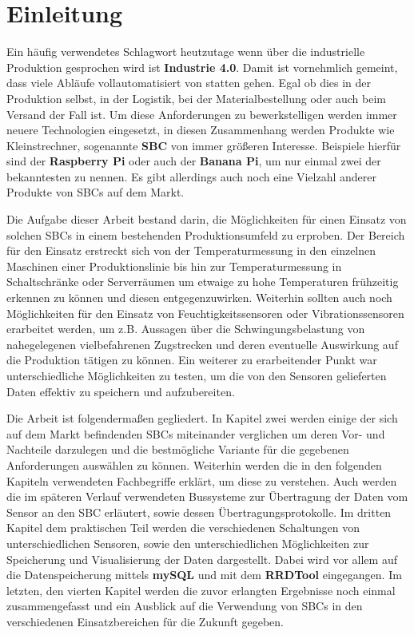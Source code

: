 \chapter{Einleitung}

Ein häufig verwendetes Schlagwort heutzutage wenn über die industrielle Produktion gesprochen wird ist \textbf{Industrie 4.0}. Damit ist vornehmlich gemeint, dass viele Abläufe vollautomatisiert von statten gehen. Egal ob dies in der Produktion selbst, in der Logistik, bei der Materialbestellung oder auch beim Versand der Fall ist. Um diese Anforderungen zu bewerkstelligen werden immer neuere Technologien eingesetzt, in diesen Zusammenhang werden Produkte wie Kleinstrechner, sogenannte \textbf{\ac{SBC}} von immer größeren Interesse. Beispiele hierfür sind der \textbf{\glqq Raspberry Pi\grqq} oder auch der \textbf{\glqq Banana Pi\grqq}, um nur einmal zwei der bekanntesten zu nennen. Es gibt allerdings auch noch eine Vielzahl anderer Produkte von \acp{SBC} auf dem Markt.

Die Aufgabe dieser Arbeit bestand darin, die Möglichkeiten für einen Einsatz von solchen \acp{SBC} in einem bestehenden Produktionsumfeld zu erproben. Der Bereich für den Einsatz erstreckt sich von der Temperaturmessung in den einzelnen Maschinen einer Produktionslinie bis hin zur Temperaturmessung in Schaltschränke oder Serverräumen um etwaige zu hohe Temperaturen frühzeitig erkennen zu können und diesen entgegenzuwirken. Weiterhin sollten auch noch Möglichkeiten für den Einsatz von Feuchtigkeitssensoren oder Vibrationssensoren erarbeitet werden, um z.B. Aussagen über die Schwingungsbelastung von nahegelegenen vielbefahrenen Zugstrecken und deren eventuelle Auswirkung auf die Produktion tätigen zu können. Ein weiterer zu erarbeitender Punkt war unterschiedliche Möglichkeiten zu testen, um die von den Sensoren gelieferten Daten effektiv zu speichern und aufzubereiten.

Die Arbeit ist folgendermaßen gegliedert. In Kapitel zwei werden einige der sich auf dem Markt befindenden \acp{SBC} miteinander verglichen um deren Vor- und Nachteile darzulegen und die bestmögliche Variante für die gegebenen Anforderungen auswählen zu können. Weiterhin werden die in den folgenden Kapiteln verwendeten Fachbegriffe erklärt, um diese zu verstehen. Auch werden die im späteren Verlauf verwendeten Bussysteme zur Übertragung der Daten vom Sensor an den \acl{SBC} erläutert, sowie dessen Übertragungsprotokolle. Im dritten Kapitel dem praktischen Teil werden die verschiedenen Schaltungen von unterschiedlichen Sensoren, sowie den unterschiedlichen Möglichkeiten zur Speicherung und Visualisierung der Daten dargestellt. Dabei wird vor allem auf die Datenspeicherung mittels \textbf{mySQL} und mit dem \textbf{RRDTool} eingegangen. Im letzten, den vierten Kapitel werden die zuvor erlangten Ergebnisse noch einmal zusammengefasst und ein Ausblick auf die Verwendung von \acp{SBC} in den verschiedenen Einsatzbereichen für die Zukunft gegeben.